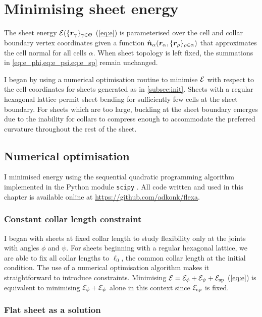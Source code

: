 \section{Minimising sheet energy}

The sheet energy $\mathcal{E}(\{\bm{r}_\gamma \}_{\gamma \in \mathfrak{G}}$ (\cref{eq:e}) is parameterised over the cell and collar boundary vertex coordinates given a function $\hat{\bm{n}}_\alpha(\bm{r}_\alpha, \{\bm{r}_\rho \}_{\rho\in\alpha})$ that approximates the cell normal for all cells $\alpha$.
When sheet topology is left fixed, the summations in \cref{eq:e_phi,eq:e_psi,eq:e_sp} remain unchanged.

I began by using a numerical optimisation routine to minimise $\mathcal{E}$ with respect to the cell coordinates for sheets generated as in \cref{subsec:init}. 
Sheets with a regular hexagonal lattice permit sheet bending for sufficiently few cells at the sheet boundary.
For sheets which are too large, buckling at the sheet boundary emerges due to the inability for collars to compress enough to accommodate the preferred curvature throughout the rest of the sheet.

\subsection{Numerical optimisation}

I minimised energy using the sequential quadratic programming algorithm implemented in the Python module \texttt{scipy} \citep{kraft1994}.
All code written and used in this chapter is available online at \url{https://github.com/adkonk/flexa}.

\subsubsection{Constant collar length constraint}

I began with sheets at fixed collar length to study flexibility only at the joints with angles $\phi$ and $\psi$.
For sheets beginning with a regular hexagonal lattice, we are able to fix all collar lengths to $\ell_0$, the common collar length at the initial condition. 
The use of a numerical optimisation algorithm makes it straightforward to introduce constraints. 
Minimising $\mathcal{E} = \mathcal{E}_\phi + \mathcal{E}_\psi + \mathcal{E}_{\text{sp}}$ (\cref{eq:e}) is equivalent to minimising $\mathcal{E}_\phi + \mathcal{E}_\psi$ alone in this context since $\mathcal{E}_{\text{sp}}$ is fixed.

\subsubsection{Flat sheet as a solution} \label{subsubsec:flat}

